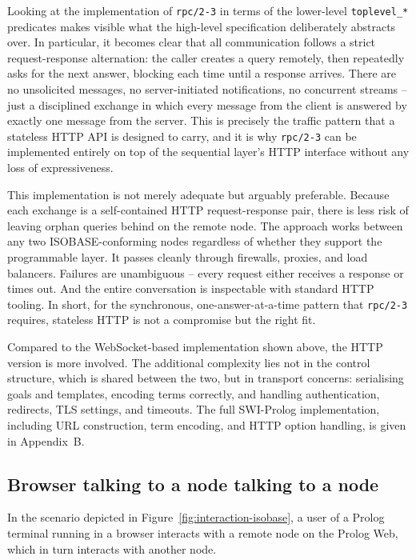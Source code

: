 Looking at the implementation of \texttt{rpc/2-3} in terms of the lower-level
\texttt{toplevel\_*} predicates makes visible what the high-level specification
deliberately abstracts over. In particular, it becomes clear that all
communication follows a strict request-response alternation: the caller creates
a query remotely, then repeatedly asks for the next answer, blocking each time
until a response arrives. There are no unsolicited messages, no server-initiated
notifications, no concurrent streams -- just a disciplined exchange in which
every message from the client is answered by exactly one message from the server.
This is precisely the traffic pattern that a stateless HTTP API is designed to
carry, and it is why \texttt{rpc/2-3} can be implemented entirely on top of the
sequential layer's HTTP interface without any loss of expressiveness.

This implementation is not merely adequate but arguably preferable. Because each
exchange is a self-contained HTTP request-response pair, there is less risk of
leaving orphan queries behind on the remote node. The approach works between any
two ISOBASE-conforming nodes regardless of whether they support the programmable
layer. It passes cleanly through firewalls, proxies, and load balancers. Failures
are unambiguous -- every request either receives a response or times out. And the
entire conversation is inspectable with standard HTTP tooling. In short, for the
synchronous, one-answer-at-a-time pattern that \texttt{rpc/2-3} requires,
stateless HTTP is not a compromise but the right fit.

Compared to the WebSocket-based implementation shown above, the HTTP version is
more involved. The additional complexity lies not in the control structure, which
is shared between the two, but in transport concerns: serialising goals and
templates, encoding terms correctly, and handling authentication, redirects, TLS
settings, and timeouts. The full SWI-Prolog implementation, including URL
construction, term encoding, and HTTP option handling, is given in Appendix~B.



\subsection{Browser talking to a node talking to a node}\label{sec:example-two-hop}

\noindent In the scenario depicted in Figure~\ref{fig:interaction-isobase}, a user of a Prolog terminal running in a browser interacts with a remote node on the Prolog Web, which in turn interacts with another node. 

